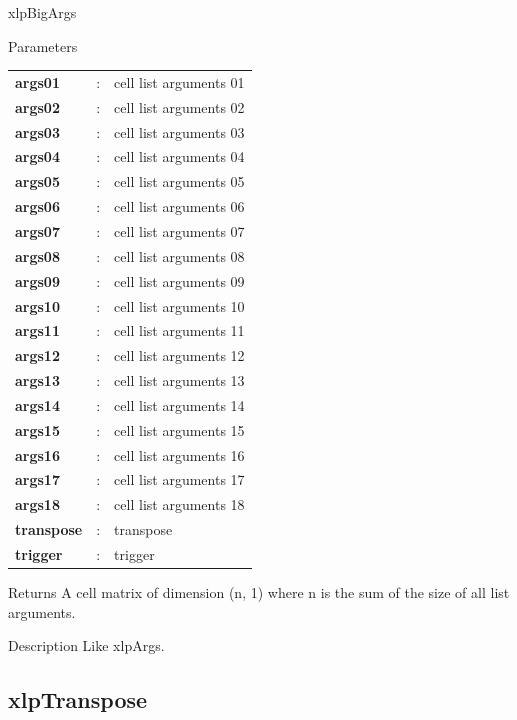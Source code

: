 \begin{xlpfunctitle}{xlpBigArgs}

\begin{xlpfunc}{Parameters}
\begin{tabular}{p{3.5cm}cl}
\textbf{args01}& : & cell list arguments 01 \\
\textbf{args02}& : & cell list arguments 02 \\
\textbf{args03}& : & cell list arguments 03 \\
\textbf{args04}& : & cell list arguments 04 \\
\textbf{args05}& : & cell list arguments 05 \\
\textbf{args06}& : & cell list arguments 06 \\
\textbf{args07}& : & cell list arguments 07 \\
\textbf{args08}& : & cell list arguments 08 \\
\textbf{args09}& : & cell list arguments 09 \\
\textbf{args10}& : & cell list arguments 10 \\
\textbf{args11}& : & cell list arguments 11 \\
\textbf{args12}& : & cell list arguments 12 \\
\textbf{args13}& : & cell list arguments 13 \\
\textbf{args14}& : & cell list arguments 14 \\
\textbf{args15}& : & cell list arguments 15 \\
\textbf{args16}& : & cell list arguments 16 \\
\textbf{args17}& : & cell list arguments 17 \\
\textbf{args18}& : & cell list arguments 18 \\
\textbf{transpose}& : & transpose \\
\textbf{trigger}& : & trigger 
\end{tabular}
\end{xlpfunc}


\begin{xlpfunc}{Returns}
A cell matrix of dimension (n, 1) where n is the sum of the size of all list arguments.
\end{xlpfunc}

\begin{xlpfunc}{Description}
Like xlpArgs.
\end{xlpfunc}
\end{xlpfunctitle}


\subsection{xlpTranspose}

